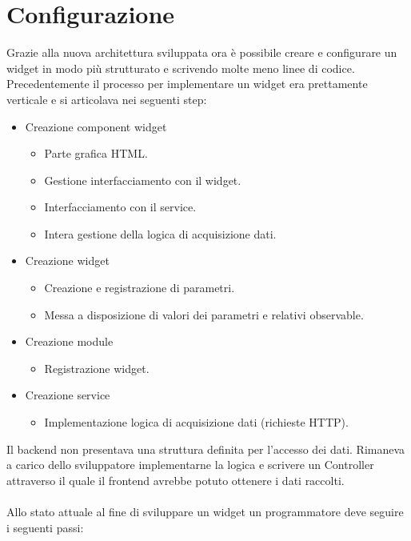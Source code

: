\FloatBarrier
\pagebreak
\section{Configurazione}
Grazie alla nuova architettura sviluppata ora è possibile creare e configurare un widget in modo più strutturato e scrivendo molte meno linee di codice. 
Precedentemente il processo per implementare un widget era prettamente verticale e si articolava nei seguenti step:
\begin{itemize}
\item
Creazione component widget
\begin{itemize}
\item
Parte grafica HTML.
\item
Gestione interfacciamento con il widget.
\item
Interfacciamento con il service.
\item
Intera gestione della logica di acquisizione dati.
\end{itemize}
\item
Creazione widget
\begin{itemize}
\item
Creazione e registrazione di parametri.
\item
Messa a disposizione di valori dei parametri e relativi observable.
\end{itemize}
\item
Creazione module
\begin{itemize}
\item
Registrazione widget.
\end{itemize}
\item
Creazione service
\begin{itemize}
\item
Implementazione logica di acquisizione dati (richieste HTTP).
\end{itemize}
\end{itemize}
Il backend non presentava una struttura definita per l'accesso dei dati. Rimaneva a carico dello sviluppatore implementarne la logica e scrivere un Controller attraverso il quale il frontend avrebbe potuto ottenere i dati raccolti.\\\\
Allo stato attuale al fine di sviluppare un widget un programmatore deve seguire i seguenti passi:
